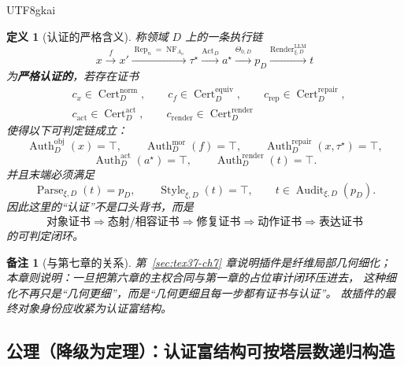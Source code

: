 \documentclass[12pt]{article}
\newtheorem{definition}{定义}[section]
\newtheorem{remark}{备注}[section]
\newcommand{\Parse}{\operatorname{Parse}}
\newcommand{\Audit}{\operatorname{Audit}}
\newcommand{\Cert}{\operatorname{Cert}}
\newcommand{\Auth}{\operatorname{Auth}}
\newcommand{\Render}{\operatorname{Render}}
\newcommand{\Style}{\operatorname{Style}}
\begin{document}
\begin{CJK*}{UTF8}{gkai}
\begin{definition}[认证的严格含义]
\label{def:tex37-ch8-auth-meaning}
称领域 $D$ 上的一条执行链
\[
  x
  \xrightarrow{f}
  x'
  \xrightarrow{\operatorname{Rep}_n=\operatorname{NF}_{A_n}}
  \tau^\star
  \xrightarrow{\operatorname{Act}_D}
  a^\star
  \xrightarrow{\Theta_{0,D}}
  p_D
  \xrightarrow{\Render^{\mathrm{LLM}}_{\xi,D}}
  t
\]
为\textbf{严格认证的}，若存在证书
\[
  \begin{aligned}
    &c_x\in \Cert_D^{\mathrm{norm}},
    \qquad
    c_f\in \Cert_D^{\mathrm{equiv}},
    \qquad
    c_{\mathrm{rep}}\in \Cert_D^{\mathrm{repair}},\\
    &c_{\mathrm{act}}\in \Cert_D^{\mathrm{act}},
    \qquad
    c_{\mathrm{render}}\in \Cert_D^{\mathrm{render}}
  \end{aligned}
\]
使得以下可判定链成立：
\[
  \Auth_D^{\mathrm{obj}}(x)=\top,
  \qquad
  \Auth_D^{\mathrm{mor}}(f)=\top,
  \qquad
  \Auth_D^{\mathrm{repair}}(x,\tau^\star)=\top,
\]
\[
  \Auth_D^{\mathrm{act}}(a^\star)=\top,
  \qquad
  \Auth_D^{\mathrm{render}}(t)=\top.
\]
并且末端必须满足
\[
  \Parse_{\xi,D}(t)=p_D,
  \qquad
  \Style_{\xi,D}(t)=\top,
  \qquad
  t\in \Audit_{\xi,D}(p_D).
\]
因此这里的“认证”不是口头背书，而是
\[
  \text{对象证书}
  \Rightarrow
  \text{态射/相容证书}
  \Rightarrow
  \text{修复证书}
  \Rightarrow
  \text{动作证书}
  \Rightarrow
  \text{表达证书}
\]
的可判定闭环。
\end{definition}

\begin{remark}[与第七章的关系]
第~\ref{sec:tex37-ch7} 章说明插件是纤维局部几何细化；
本章则说明：一旦把第六章的主权合同与第一章的占位审计闭环压进去，
这种细化不再只是“几何更细”，而是“几何更细且每一步都有证书与认证”。
故插件的最终对象身份应收紧为认证富结构。
\end{remark}

\subsection{公理（降级为定理）：认证富结构可按塔层数递归构造}
\label{subsec:tex37-ch8-axiom}


\end{CJK*}
\end{document}
